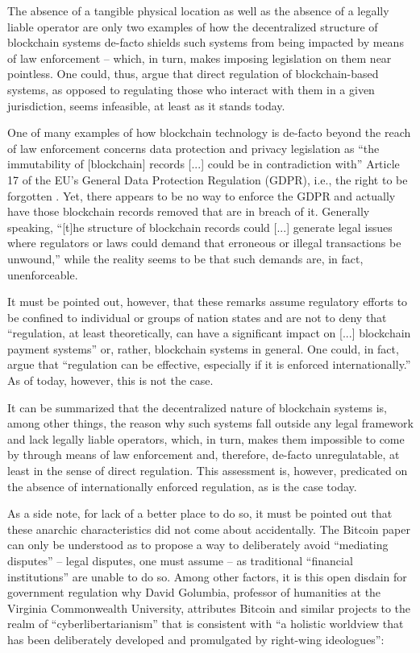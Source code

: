 The absence of a tangible physical location as well as the absence of a legally liable operator are only two examples of how the decentralized structure of blockchain systems de-facto shields such systems from being impacted by means of law enforcement -- which, in turn, makes imposing legislation on them near pointless.
One could, thus, argue that direct regulation of blockchain-based systems, as opposed to regulating those who interact with them in a given jurisdiction, seems infeasible, at least as it stands today.

One of many examples of how blockchain technology is de-facto beyond the reach of law enforcement concerns data protection and privacy legislation as ``the immutability of [blockchain] records [...] could be in contradiction with'' Article 17 of the EU's General Data Protection Regulation (GDPR), i.e., the right to be forgotten \autocite[35]{esma2017}.
Yet, there appears to be no way to enforce the GDPR and actually have those blockchain records removed that are in breach of it.
Generally speaking, ``[t]he structure of blockchain records could [...] generate legal issues where regulators or laws could demand that erroneous or illegal transactions be unwound,'' \autocite[7]{yeoh2017} while the reality seems to be that such demands are, in fact, unenforceable.

It must be pointed out, however, that these remarks assume regulatory efforts to be confined to individual or groups of nation states and are not to deny that ``regulation, at least theoretically, can have a significant impact on [...] blockchain payment systems'' or, rather, blockchain systems in general.
One could, in fact, argue that ``regulation can be effective, especially if it is enforced internationally.'' \autocite[2]{shanaev2019}
As of today, however, this is not the case. 

It can be summarized that the decentralized nature of blockchain systems is, among other things, the reason why such systems fall outside any legal framework and lack legally liable operators, which, in turn, makes them impossible to come by through means of law enforcement and, therefore, de-facto unregulatable, at least in the sense of direct regulation.
This assessment is, however, predicated on the absence of internationally enforced regulation, as is the case today.

As a side note, for lack of a better place to do so, it must be pointed out that these anarchic characteristics did not come about accidentally.
The Bitcoin paper can only be understood as to propose a way to deliberately avoid ``mediating disputes'' -- legal disputes, one must assume -- as traditional ``financial institutions'' are unable to do so. \autocite[1]{nakamoto2008}
Among other factors, it is this open disdain for government regulation why David Golumbia, professor of humanities at the Virginia Commonwealth University, attributes Bitcoin and similar projects to the realm of ``cyberlibertarianism'' that is consistent with ``a holistic worldview that has been deliberately developed and promulgated by right-wing ideologues'': \autocite[5-6]{golumbia2016}

